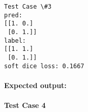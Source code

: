 \documentclass[11pt]{article}
\newenvironment{Shaded}{}{}
\newcommand{\FloatTok}[1]{\textcolor[rgb]{0.25,0.63,0.44}{{#1}}}
\newcommand{\CommentTok}[1]{\textcolor[rgb]{0.38,0.63,0.69}{\textit{{#1}}}}
\newcommand{\NormalTok}[1]{{#1}}
\begin{document}
    \begin{Verbatim}[commandchars=\\\{\}]
Test Case \#3
pred:
[[1. 0.]
 [0. 1.]]
label:
[[1. 1.]
 [0. 1.]]
soft dice loss: 0.1667

    \end{Verbatim}

    \hypertarget{expected-output}{%
\paragraph{Expected output:}\label{expected-output}}

\begin{Shaded}
\end{Shaded}

    \hypertarget{test-case-4}{%
\paragraph{Test Case 4}\label{test-case-4}}
\end{document}
